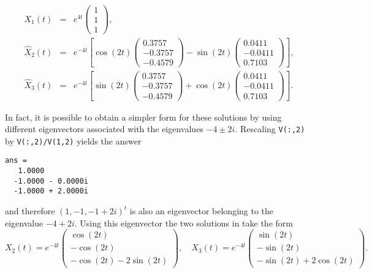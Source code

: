 \begin{eqnarray*}
X_1(t) & = & e^{4t}\left(\begin{array}{r} 1\\1\\1\end{array}\right),\\
\widehat{X}_2(t) & = & e^{-4t}\left[
\cos(2t)\left(\begin{array}{r}0.3757\\-0.3757\\-0.4579\end{array}\right)
-\sin(2t)\left(\begin{array}{r} 0.0411\\-0.0411\\0.7103\end{array}\right)
\right],\\
\widehat{X}_3(t) & = & e^{-4t}\left[
\sin(2t)\left(\begin{array}{r}0.3757\\-0.3757\\-0.4579\end{array}\right)
+\cos(2t)\left(\begin{array}{r} 0.0411\\-0.0411\\0.7103\end{array}\right)
\right].
\end{eqnarray*}


In fact, it is possible to obtain a simpler form for these solutions by 
using different eigenvectors associated with the eigenvalues $-4\pm 2i$.  
Rescaling {\tt V(:,2)} by {\tt V(:,2)/V(1,2)} yields the answer
\begin{verbatim}
ans =
   1.0000
  -1.0000 - 0.0000i
  -1.0000 + 2.0000i
\end{verbatim}
and therefore $(1,-1,-1+2i)^t$ is also an eigenvector belonging to the
eigenvalue $-4+2i$.  Using this eigenvector the two solutions in 
 take the form
\[
X_2(t) = e^{-4t}\left(\begin{array}{c}
\cos(2t)\\ -\cos(2t)\\ -\cos(2t)-2\sin(2t)\end{array}\right),\quad
X_3(t) = e^{-4t}\left(\begin{array}{c}
\sin(2t)\\ -\sin(2t)\\ -\sin(2t)+2\cos(2t)\end{array}\right).
\]

